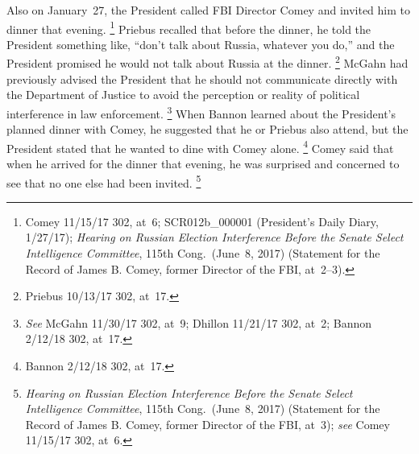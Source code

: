 Also on January~27, the President called FBI Director Comey and invited him to dinner that evening.%
\footnote{Comey 11/15/17 302, at~6;
SCR012b\_000001 (President's Daily Diary, 1/27/17);
\textit{Hearing on Russian Election Interference Before the Senate Select Intelligence Committee}, 115th Cong.\ (June~8, 2017) (Statement for the Record of James B. Comey, former Director of the FBI, at~2--3).}
Priebus recalled that before the dinner, he told the President something like, ``don't talk about Russia, whatever you do,'' and the President promised he would not talk about Russia at the dinner.%
\footnote{Priebus 10/13/17 302, at~17.}
McGahn had previously advised the President that he should not communicate directly with the Department of Justice to avoid the perception or reality of political interference in law enforcement.%
\footnote{\textit{See} McGahn 11/30/17 302, at~9;
Dhillon 11/21/17 302, at~2;
Bannon 2/12/18 302, at~17.}
When Bannon learned about the President's planned dinner with Comey, he suggested that he or Priebus also attend, but the President stated that he wanted to dine with Comey alone.%
\footnote{Bannon 2/12/18 302, at~17.}
Comey said that when he arrived for the dinner that evening, he was surprised and concerned to see that no one else had been invited.%
\footnote{\textit{Hearing on Russian Election Interference Before the Senate Select Intelligence Committee}, 115th Cong.\ (June~8, 2017) (Statement for the Record of James B. Comey, former Director of the FBI, at~3);
\textit{see} Comey 11/15/17 302, at~6.}


